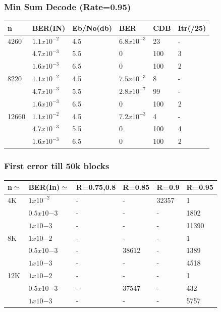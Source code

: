 \documentclass[xcolor=dvipsname]
{beamer}
\begin{document}
\begin{frame}[t] 
\frametitle{Min Sum Decode (Rate=0.95)}

\begin{table}[]
\centering
\begin{tabular}{|l|l|l|l|l|l|}
\hline
n     & BER(IN)& Eb/No(db) & BER    & CDB & Itr(/25) \\ \hline
4260  & $1.1x10^{-2}$ & 4.5   & $6.8x10^{-3}$      & 23 &  -       \\ 
      & $4.7x10^{-3}$ & 5.5   & 0           & 100 & 3         \\  
      & $1.6x10^{-3}$ & 6.5   & 0           & 100 & 2         \\ \hline
8220  & $1.1x10^{-2}$ & 4.5   & $7.5x10^{-3}$      & 8 & -         \\ 
      & $4.7x10^{-3}$ & 5.5   & $2.8x10^{-7}$      & 99 & -         \\ 
      & $1.6x10^{-3}$ & 6.5   & 0      & 100 & 2         \\ \hline
12660 & $1.1x10^{-2}$ & 4.5   & $7.2x10^{-3}$      & 4 & -        \\ 
      & $4.7x10^{-3}$ & 5.5   & 0      & 100 & 4         \\ 
      & $1.6x10^{-3}$ & 6.5   & 0      & 100 & 2         \\ \hline      
\end{tabular}
\end{table}

\end{frame}

\begin{frame}[t] 
\frametitle{First error till 50k blocks}

\begin{table}[]
\centering
\begin{tabular}{|l|l|l|l|l|l|}
\hline
n$\simeq$   & BER(In)$\simeq$    & R=0.75,0.8 & R=0.85  & R=0.9 & R=0.95 \\ \hline
4K  & $1x10^{-2}$  & -          & -    & 32357   & 1       \\ \hline
    & $0.5x10{-3}$ & -          & -    & - & 1802   \\ \hline
    & $1x10{-3}$   & -          & -    & -     & 11390  \\ \hline
8K  & $1x10{-2}$   & -          & -    & -   & 1      \\ \hline
    & $0.5x10{-3}$ & -          & 38612   & -    & 1389   \\ \hline
    & $1x10{-3}$   & -          & -       & -     & 4518   \\ \hline
12K & $1x10{-2}$   & -          & -    & -     & 1      \\ \hline
    & $0.5x10{-3}$ & -          & 37547   & -     & 432    \\ \hline
    & $1x10{-3}$   & -          & -       & -     & 5757   \\ \hline
\end{tabular}
\end{table}

\end{frame}
\end{document}
